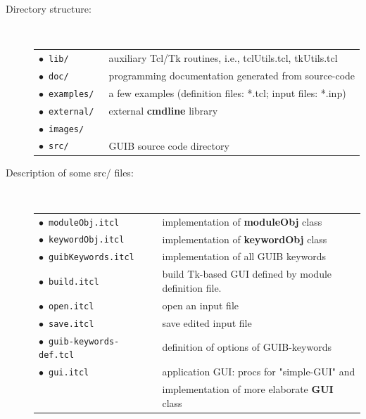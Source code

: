 \documentclass[12pt]{article}
\def\key#1{{\bf #1}}
\begin{document}
\begin{description}
\item[Directory structure:]~\\
  \begin{tabular}[t]{ll}
    $\bullet$~\tt lib/      & auxiliary Tcl/Tk routines, i.e., tclUtils.tcl, tkUtils.tcl\\
    $\bullet$~\tt doc/      & programming documentation generated from source-code\\
    $\bullet$~\tt examples/ & a few examples (definition files: *.tcl; input files: *.inp)\\
    $\bullet$~\tt external/ & external \key{cmdline} library\\
    $\bullet$~\tt images/   & \\
    $\bullet$~\tt src/      & GUIB source code directory\\
  \end{tabular}
\item[Description of some src/ files:]~\\
  \begin{tabular}[t]{ll}
    $\bullet$~\tt moduleObj.itcl    & implementation of \key{moduleObj} class\\
    $\bullet$~\tt keywordObj.itcl   & implementation of \key{keywordObj} class\\
    $\bullet$~\tt guibKeywords.itcl & implementation of all GUIB keywords\\
    $\bullet$~\tt build.itcl        & build Tk-based GUI defined by module definition file.\\
    $\bullet$~\tt open.itcl         & open an input file\\     
    $\bullet$~\tt save.itcl         & save edited input file\\[1em]    
    $\bullet$~\tt guib-keywords-def.tcl & definition of options of GUIB-keywords\\[1em]
    $\bullet$~\tt gui.itcl          & application GUI: procs for "simple-GUI" and\\
                                    & implementation of more elaborate \key{GUI} class\\[1em]
  \end{tabular}
\end{description}
\end{document}
